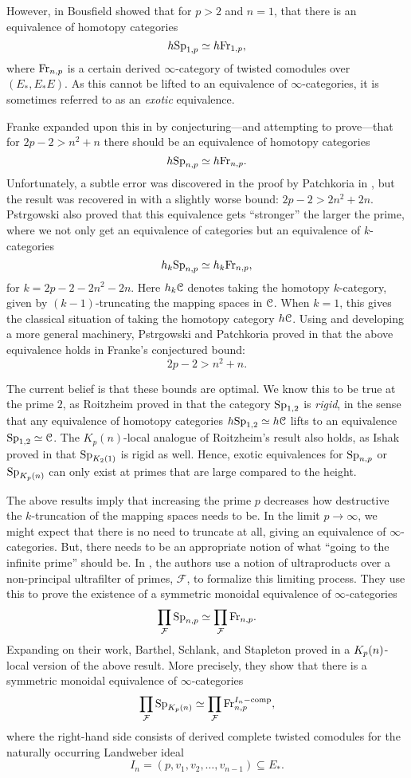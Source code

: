 However, in \cite{bousfield_1985} Bousfield showed that for $p>2$ and $n=1$, that there is an equivalence of homotopy categories
\[h \mathrm{Sp}_{1,p}\simeq h \mathrm{Fr}_{1,p},\]
where $\mathrm{Fr}_{n,p}$ is a certain derived $\infty$-category of twisted comodules over $(E_*, E_*E)$. As this cannot be lifted to an equivalence of $\infty$-categories, it is sometimes referred to as an \emph{exotic} equivalence. 

Franke expanded upon this in \cite{franke_96} by conjecturing---and attempting to prove---that for $2p-2 > n^2+n$ there should be an equivalence of homotopy categories
\[h \mathrm{Sp}_{n,p}\simeq h \mathrm{Fr}_{n,p}.\]
Unfortunately, a subtle error was discovered in the proof by Patchkoria in \cite{patchkoria_2013}, but the result was recovered in \cite{pstragowski_2021} with a slightly worse bound: $2p-2>2n^2+2n$. Pstr\a{}gowski also proved that this equivalence gets ``stronger'' the larger the prime, where we not only get an equivalence of categories but an equivalence of $k$-categories 
\[h_k \mathrm{Sp}_{n,p}\simeq h_k \mathrm{Fr}_{n,p},\]
for $k=2p-2-2n^2-2n$. Here $h_k \EuScript{C}$ denotes taking the homotopy $k$-category, given by $(k-1)$-truncating the mapping spaces in $\EuScript{C}$. When $k=1$, this gives the classical situation of taking the homotopy category $h\EuScript{C}$. Using and developing a more general machinery, Pstr\a{}gowski and Patchkoria proved in \cite{patchkoria-pstragowski_2021} that the above equivalence holds in Franke's conjectured bound:
\[2p-2>n^2+n.\] 

The current belief is that these bounds are optimal. We know this to be true at the prime $2$, as Roitzheim proved in \cite{roitzheim_07} that the category $\mathrm{Sp}_{1,2}$ is \emph{rigid}, in the sense that any equivalence of homotopy categories $h\mathrm{Sp}_{1,2} \simeq h\EuScript{C}$ lifts to an equivalence $\mathrm{Sp}_{1,2}\simeq \EuScript{C}$. The $K_p(n)$-local analogue of Roitzheim's result also holds, as Ishak proved in \cite{ishak_19} that $\mathrm{Sp}_{K_2(1)}$ is rigid as well. Hence, exotic equivalences for $\mathrm{Sp}_{n,p}$ or $\mathrm{Sp}_{{K_p(n)}}$ can only exist at primes that are large compared to the height. 

The above results imply that increasing the prime $p$ decreases how destructive the $k$-truncation of the mapping spaces needs to be. In the limit $p\rightarrow \infty$, we might expect that there is no need to truncate at all, giving an equivalence of $\infty$-categories. But, there needs to be an appropriate notion of what ``going to the infinite prime'' should be. In \cite{barthel-schlank-stapleton_2020}, the authors use a notion of ultraproducts over a non-principal ultrafilter of primes, $\mathcal{F}$, to formalize this limiting process. They use this to prove the existence of a symmetric monoidal equivalence of $\infty$-categories
\[\prod_{\mathcal{F}}\mathrm{Sp}_{n,p} \simeq \prod_{\mathcal{F}}\mathrm{Fr}_{n,p}.\] 
Expanding on their work, Barthel, Schlank, and Stapleton proved in \cite{barthel-schlank-stapleton_2021} a ${K_p(n)}$-local version of the above result. More precisely, they show that there is a symmetric monoidal equivalence of $\infty$-categories
\[\prod_{\mathcal{F}}\mathrm{Sp}_{{K_p(n)}} \simeq \prod_{\mathcal{F}}\mathrm{Fr}_{n,p}^{I_n-\mathrm{comp}},\]
where the right-hand side consists of derived complete twisted comodules for the naturally occurring Landweber ideal 
\[I_n = (p, v_1, v_2, \ldots, v_{n-1})\subseteq E_* .\] 

